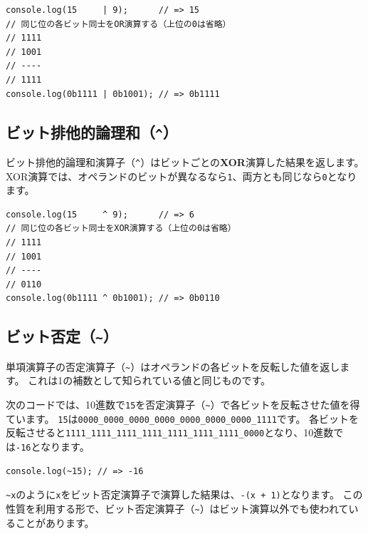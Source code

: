 \begin{lstlisting}
console.log(15     | 9);      // => 15
// 同じ位の各ビット同士をOR演算する（上位の0は省略）
// 1111
// 1001
// ----
// 1111
console.log(0b1111 | 0b1001); // => 0b1111
\end{lstlisting}

\hypertarget{bit-xor}{%
\subsection{\texorpdfstring{ビット排他的論理和（\texttt{\^{}}）}{ビット排他的論理和（\^{}）}}\label{bit-xor}}

ビット排他的論理和演算子（\texttt{\^{}}）はビットごとの\textbf{XOR}演算した結果を返します。
XOR演算では、オペランドのビットが異なるなら\texttt{1}、両方とも同じなら\texttt{0}となります。

\begin{lstlisting}
console.log(15     ^ 9);      // => 6
// 同じ位の各ビット同士をXOR演算する（上位の0は省略）
// 1111
// 1001
// ----
// 0110
console.log(0b1111 ^ 0b1001); // => 0b0110
\end{lstlisting}

\hypertarget{bit-not}{%
\subsection{\texorpdfstring{ビット否定（\texttt{\textasciitilde{}}）}{ビット否定（\textasciitilde{}）}}\label{bit-not}}

単項演算子の否定演算子（\lstinline{~}）はオペランドの各ビットを反転した値を返します。
これは1の補数として知られている値と同じものです。

次のコードでは、10進数で\texttt{15}を否定演算子（\lstinline{~}）で各ビットを反転させた値を得ています。
\texttt{15}は\texttt{0000\_0000\_0000\_0000\_0000\_0000\_0000\_1111}です。
各ビットを反転させると\texttt{1111\_1111\_1111\_1111\_1111\_1111\_1111\_0000}となり、10進数では\texttt{-16}となります。

\begin{lstlisting}
console.log(~15); // => -16
\end{lstlisting}

\lstinline{~x}のように\texttt{x}をビット否定演算子で演算した結果は、\lstinline{-(x + 1)}となります。
この性質を利用する形で、ビット否定演算子（\lstinline{~}）はビット演算以外でも使われていることがあります。

